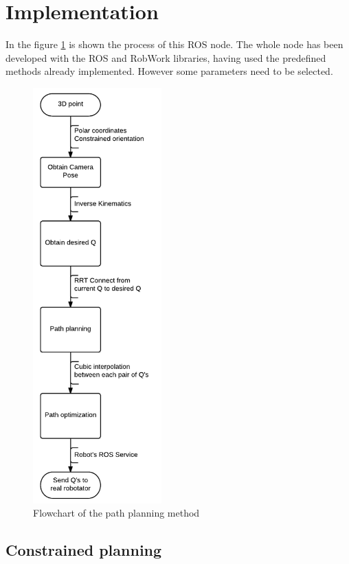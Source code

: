 \section{Implementation} %
\label{sec:implementation_pathplanning}
In the figure \ref{fig:path_planning_flowchart} is shown the process of this ROS node. The whole node has been developed with the ROS and RobWork libraries, having used the predefined methods already implemented. However some parameters need to be selected.
\begin{figure}[!hb]
	\centering
	\includegraphics[height=16cm]{figures/path_planning_flowchart}
	\caption{Flowchart of the path planning method}
	\label{fig:path_planning_flowchart}
\end{figure}

	\subsection{Constrained planning} %
	\label{sub:contrained_planning_implementation}
